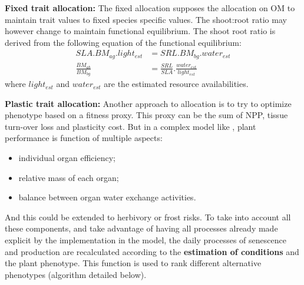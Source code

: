 \textbf{Fixed trait allocation:} The fixed allocation supposes the allocation on OM to maintain trait values to fixed species specific values. The shoot:root ratio may however change to maintain functional equilibrium. The shoot root ratio is derived from the following equation of the functional equilibrium:
\begin{align}\label{eq:equilibrium}
SLA . BM_{ag} . light_{est} &= SRL . BM_{bg} . water_{est}\\
\frac{BM_{ab}}{BM_{bg}} &= \frac{SRL}{SLA} . \frac{water_{est}}{light_{est}}
\end{align}
where $light_{est}$ and $water_{est}$ are the estimated resource availabilities.
%

\textbf{Plastic trait allocation:} Another approach to allocation is to try to optimize phenotype based on a fitness proxy. This proxy can  be the sum of NPP, tissue turn-over loss and plasticity cost. But in a complex model like \model, plant performance is function of multiple aspects:\
\begin{itemize}
\item individual organ efficiency;
\item relative mass of each organ;
\item balance between organ water exchange activities.
\end{itemize}
And this could be extended to herbivory or frost risks. To take into account all these components, and take advantage of having all processes already made explicit by the implementation in the model, the daily processes of senescence and production are recalculated according to the \textbf{estimation of conditions} and the plant phenotype. This function is used to rank different alternative phenotypes (algorithm detailed below).

